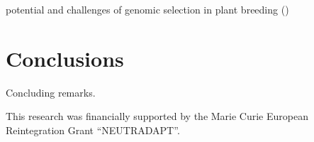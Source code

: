 potential and challenges of genomic selection in plant breeding (\cite{jonas2013does})

%

\section{Conclusions}
\label{sec:conclusions}

Concluding remarks. 


\begin{acknowledgements}
This research was financially supported by the Marie Curie European
Reintegration Grant ``NEUTRADAPT''.
\end{acknowledgements}


